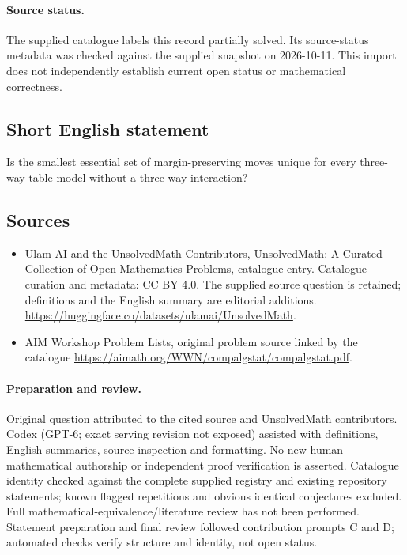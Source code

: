 \documentclass[11pt]{article}
\begin{document}
\paragraph{Source status.}
The supplied catalogue labels this record partially solved. Its source-status metadata was checked against the supplied snapshot on 2026-10-11. This import does not independently establish current open status or mathematical correctness.
\subsection{Short English statement}
Is the smallest essential set of margin-preserving moves unique for every three-way table model without a three-way interaction?
\subsection{Sources}
\begin{itemize}
\item[\hypertarget{source:statement:1}{S1}] Ulam AI and the UnsolvedMath Contributors, UnsolvedMath: A Curated Collection of Open Mathematics Problems, catalogue entry. Catalogue curation and metadata: CC BY 4.0. The supplied source question is retained; definitions and the English summary are editorial additions.
\url{https://huggingface.co/datasets/ulamai/UnsolvedMath}.
\item[\hypertarget{source:statement:2}{S2}] AIM Workshop Problem Lists, original problem source linked by the catalogue
\url{https://aimath.org/WWN/compalgstat/compalgstat.pdf}.
\end{itemize}
\paragraph{Preparation and review.}
Original question attributed to the cited source and UnsolvedMath contributors. Codex (GPT-6; exact serving revision not exposed) assisted with definitions, English summaries, source inspection and formatting. No new human mathematical authorship or independent proof verification is asserted. Catalogue identity checked against the complete supplied registry and existing repository statements; known flagged repetitions and obvious identical conjectures excluded. Full mathematical-equivalence/literature review has not been performed. Statement preparation and final review followed contribution prompts C and D; automated checks verify structure and identity, not open status.
\label{end:statement}
\end{document}
